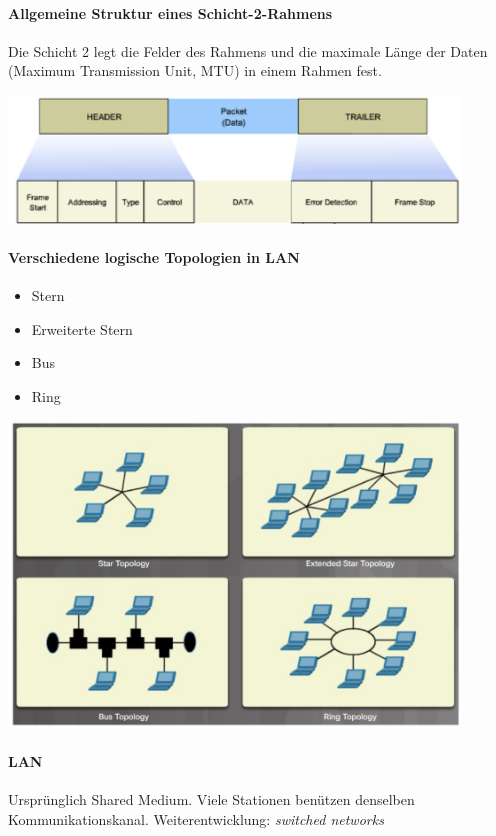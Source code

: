 \documentclass[a4paper,12pt]{article}
\begin{document}
\paragraph{Allgemeine Struktur eines Schicht-2-Rahmens}
Die Schicht 2 legt die Felder des Rahmens und die maximale Länge der Daten (Maximum Transmission Unit, MTU) in einem Rahmen fest.

\begin{center}
\includegraphics[width=12cm]{img/04_L2_frame.png}
\end{center}

\paragraph{Verschiedene logische Topologien in LAN}

\begin{itemize}
\item Stern
\item Erweiterte Stern
\item Bus
\item Ring
\end{itemize}

\begin{center}
\includegraphics[width=12cm]{img/04_lan_topology.png}
\end{center}

\paragraph{LAN} Ursprünglich Shared Medium. Viele Stationen benützen denselben Kommunikationskanal. Weiterentwicklung: \emph{switched networks}
\end{document}
